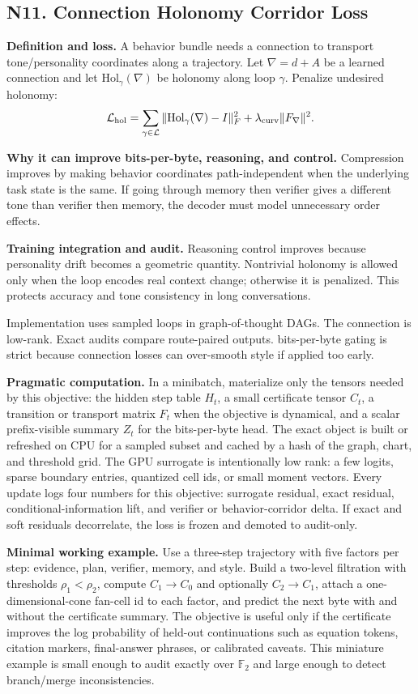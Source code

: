 \documentclass[10pt]{article}
\newcommand{\FF}{\mathbb{F}}
\newcommand{\loss}{\mathcal{L}}
\numberwithin{equation}{section}
\begin{document}
\subsection{N11. Connection Holonomy Corridor Loss}
\noindent\textbf{Definition and loss.} A behavior bundle needs a connection to transport tone/personality coordinates along a trajectory. Let $\nabla=d+A$ be a learned connection and let $\mathrm{Hol}_\gamma(\nabla)$ be holonomy along loop $\gamma$. Penalize undesired holonomy:
\[
\loss_{\rm hol}=\sum_{\gamma\in\mathcal L}\|\mathrm{Hol}_\gamma(\nabla)-I\|_F^2+\lambda_{\rm curv}\|F_\nabla\|^2.
\]

\noindent\textbf{Why it can improve bits-per-byte, reasoning, and control.} Compression improves by making behavior coordinates path-independent when the underlying task state is the same. If going through memory then verifier gives a different tone than verifier then memory, the decoder must model unnecessary order effects.

\noindent\textbf{Training integration and audit.} Reasoning control improves because personality drift becomes a geometric quantity. Nontrivial holonomy is allowed only when the loop encodes real context change; otherwise it is penalized. This protects accuracy and tone consistency in long conversations.

Implementation uses sampled loops in graph-of-thought DAGs. The connection is low-rank. Exact audits compare route-paired outputs. bits-per-byte gating is strict because connection losses can over-smooth style if applied too early.

\noindent\textbf{Pragmatic computation.} In a minibatch, materialize only the tensors needed by this objective: the hidden step table $H_t$, a small certificate tensor $C_t$, a transition or transport matrix $F_t$ when the objective is dynamical, and a scalar prefix-visible summary $Z_t$ for the bits-per-byte head. The exact object is built or refreshed on CPU for a sampled subset and cached by a hash of the graph, chart, and threshold grid. The GPU surrogate is intentionally low rank: a few logits, sparse boundary entries, quantized cell ids, or small moment vectors. Every update logs four numbers for this objective: surrogate residual, exact residual, conditional-information lift, and verifier or behavior-corridor delta. If exact and soft residuals decorrelate, the loss is frozen and demoted to audit-only.

\noindent\textbf{Minimal working example.} Use a three-step trajectory with five factors per step: evidence, plan, verifier, memory, and style. Build a two-level filtration with thresholds $\rho_1<\rho_2$, compute $C_1\to C_0$ and optionally $C_2\to C_1$, attach a one-dimensional-cone fan-cell id to each factor, and predict the next byte with and without the certificate summary. The objective is useful only if the certificate improves the log probability of held-out continuations such as equation tokens, citation markers, final-answer phrases, or calibrated caveats. This miniature example is small enough to audit exactly over $\FF_2$ and large enough to detect branch/merge inconsistencies.
\end{document}
